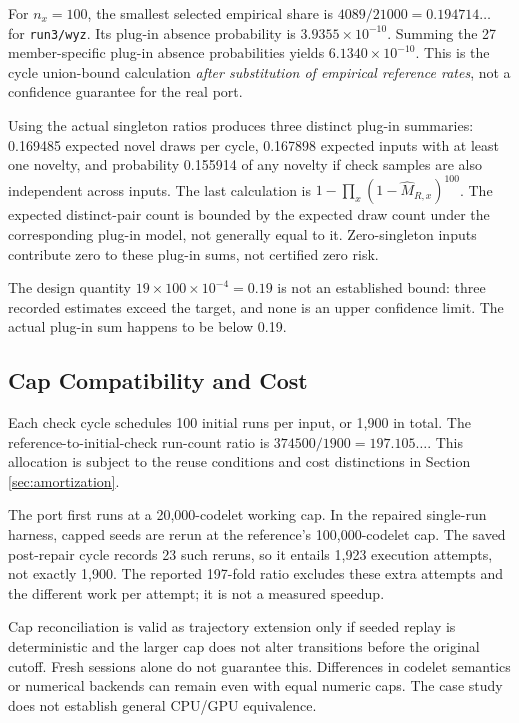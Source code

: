 \documentclass[10pt,letterpaper]{article}
\begin{document}
For \(n_x=100\), the smallest selected empirical share is \(4089/21000=0.194714\ldots\)
for \texttt{run3/wyz}. Its plug-in absence probability is \(3.9355\times10^{-10}\).
Summing the 27 member-specific plug-in absence probabilities yields
\(6.1340\times10^{-10}\). This is the cycle union-bound calculation \emph{after
substitution of empirical reference rates}, not a confidence guarantee for the real port.

Using the actual singleton ratios produces three distinct plug-in summaries: 0.169485
expected novel draws per cycle, 0.167898 expected inputs with at least one novelty, and
probability 0.155914 of any novelty if check samples are also independent across inputs.
The last calculation is \(1-\prod_x(1-\widehat M_{R,x})^{100}\). The expected
distinct-pair count is bounded by the expected draw count under the corresponding plug-in
model, not generally equal to it. Zero-singleton inputs contribute zero to these plug-in
sums, not certified zero risk.

The design quantity \(19\times100\times10^{-4}=0.19\) is not an established bound: three
recorded estimates exceed the target, and none is an upper confidence limit. The actual
plug-in sum happens to be below 0.19.

\subsection{Cap Compatibility and Cost}\label{sec:cost}

Each check cycle schedules 100 initial runs per input, or 1,900 in total. The
reference-to-initial-check run-count ratio is \(374500/1900=197.105\ldots\). This
allocation is subject to the reuse conditions and cost distinctions in Section
\ref{sec:amortization}.

The port first runs at a 20,000-codelet working cap. In the repaired single-run harness,
capped seeds are rerun at the reference's 100,000-codelet cap. The saved post-repair cycle
records 23 such reruns, so it entails 1,923 execution attempts, not exactly 1,900. The
reported 197-fold ratio excludes these extra attempts and the different work per attempt;
it is not a measured speedup.

Cap reconciliation is valid as trajectory extension only if seeded replay is deterministic
and the larger cap does not alter transitions before the original cutoff. Fresh sessions
alone do not guarantee this. Differences in codelet semantics or numerical backends can
remain even with equal numeric caps. The case study does not establish general CPU/GPU
equivalence.
\end{document}
